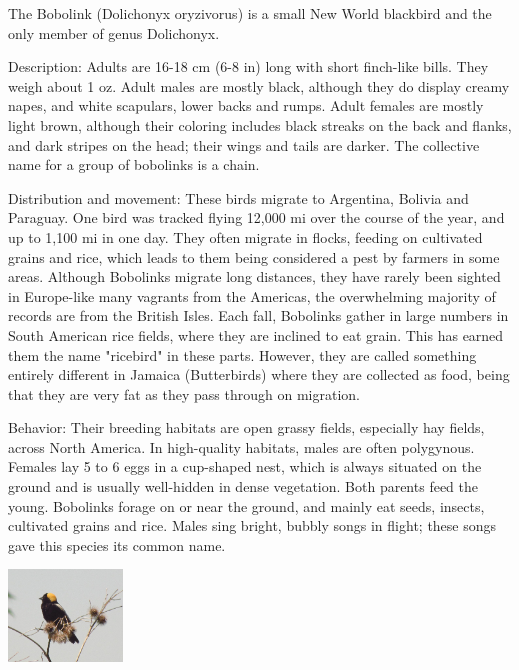 


\parbox{5.5in}{
\tiny
{\sf
The Bobolink (Dolichonyx oryzivorus) is a small New World blackbird and the only member of genus Dolichonyx.

\vspace{2pt}
Description: Adults are 16-18 cm (6-8 in) long with short finch-like bills. They weigh about 1 oz. Adult males are mostly black, although they do display creamy napes, and white scapulars, lower backs and rumps. Adult females are mostly light brown, although their coloring includes black streaks on the back and flanks, and dark stripes on the head; their wings and tails are darker. The collective name for a group of bobolinks is a chain.

\vspace{2pt}
Distribution and movement: These birds migrate to Argentina, Bolivia and Paraguay. One bird was tracked flying 12,000 mi over the course of the year, and up to 1,100 mi in one day. They often migrate in flocks, feeding on cultivated grains and rice, which leads to them being considered a pest by farmers in some areas. Although Bobolinks migrate long distances, they have rarely been sighted in Europe-like many vagrants from the Americas, the overwhelming majority of records are from the British Isles. 
Each fall, Bobolinks gather in large numbers in South American rice fields, where they are inclined to eat grain. This has earned them the name "ricebird" in these parts. However, they are called something entirely different in Jamaica (Butterbirds) where they are collected as food, being that they are very fat as they pass through on migration.


\vspace{2pt}
Behavior:
Their breeding habitats are open grassy fields, especially hay fields, across North America. In high-quality habitats, males are often polygynous. Females lay 5 to 6 eggs in a cup-shaped nest, which is always situated on the ground and is usually well-hidden in dense vegetation. Both parents feed the young. 
Bobolinks forage on or near the ground, and mainly eat seeds, insects, cultivated grains and rice.
Males sing bright, bubbly songs in flight; these songs gave this species its common name.
}}
\parbox{1.4in}{
\centering
\includegraphics[width=1.2in]{Bobolink.jpg}
}

